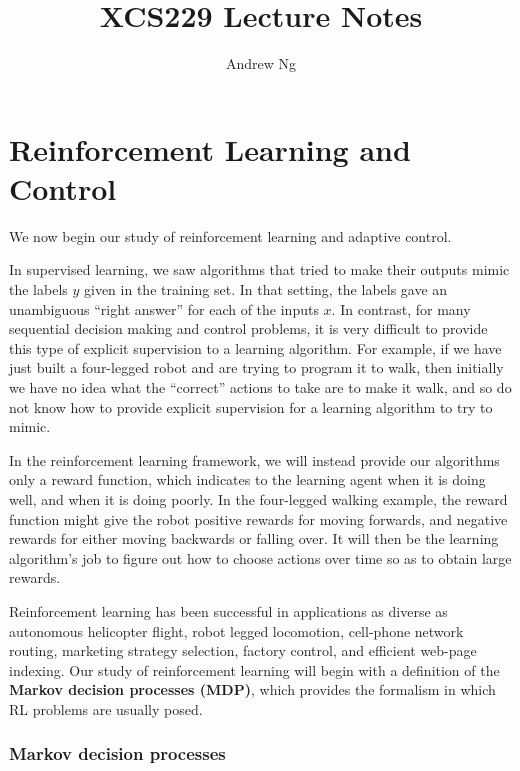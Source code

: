 \documentclass{article}
\begin{document}
\title{XCS229 Lecture Notes}
\author{Andrew Ng}
\date{}
\maketitle


\setcounter{part}{12}
\part{Reinforcement Learning and Control}

We now begin our study of reinforcement learning and adaptive control.

In supervised learning, we saw algorithms that tried to make their outputs
mimic the labels $y$ given in the training set.  In that setting, the labels
gave an unambiguous
``right answer'' for each of the inputs $x$.  In contrast, for many sequential
decision making and control problems, it is very difficult to provide this
type of
explicit supervision to a learning algorithm.  For example, if we
have just built a four-legged robot and are trying to program it to walk, then
initially we have no idea what the ``correct'' actions to take are to make it
walk, and so do not
know how to provide explicit supervision for a learning algorithm to try to mimic.

In the reinforcement learning framework, we will instead provide our algorithms
only a reward function, which indicates to the learning agent when it
is doing well, and when it is doing poorly.
In the four-legged walking example, the reward function might give the
robot positive rewards for moving forwards, and negative rewards for
either moving backwards or falling over.  It will then be the learning
algorithm's job to figure out how to choose actions over time so as
to obtain large rewards.

Reinforcement learning has been successful in applications as diverse as
autonomous helicopter flight, robot legged locomotion, cell-phone network
routing, marketing strategy selection, factory control, and efficient
web-page indexing.
Our study of reinforcement learning will begin with a definition of the
{\bf Markov decision processes (MDP)}, which provides the formalism in which
RL problems are usually posed.

\section{Markov decision processes}
\end{document}
